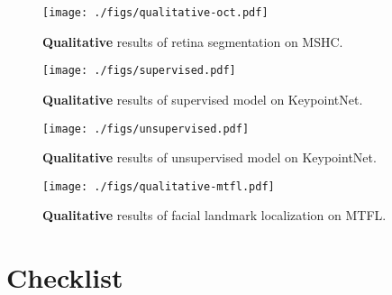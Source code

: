 \documentclass{article}
\begin{document}
\begin{figure}[h]
    \centering
    \texttt{[image: ./figs/qualitative-oct.pdf]}
    \caption{\textbf{Qualitative} results of retina segmentation on MSHC.}
    \label{fig:oct}
\end{figure}

\begin{figure}[h]
    \centering
    \texttt{[image: ./figs/supervised.pdf]}
    \caption{\textbf{Qualitative} results of supervised model on KeypointNet.}
    \label{fig:sup}
\end{figure}

\begin{figure}[h]
    \centering
    \texttt{[image: ./figs/unsupervised.pdf]}
    \caption{\textbf{Qualitative} results of unsupervised model on KeypointNet.}
    \label{fig:unsup}
\end{figure}

\begin{figure}[h]
    \centering
    \texttt{[image: ./figs/qualitative-mtfl.pdf]}
    \caption{\textbf{Qualitative} results of facial landmark localization on MTFL.}
    \label{fig:mtfl}
\end{figure}

 

\clearpage
\newpage

\section*{Checklist}
\end{document}
